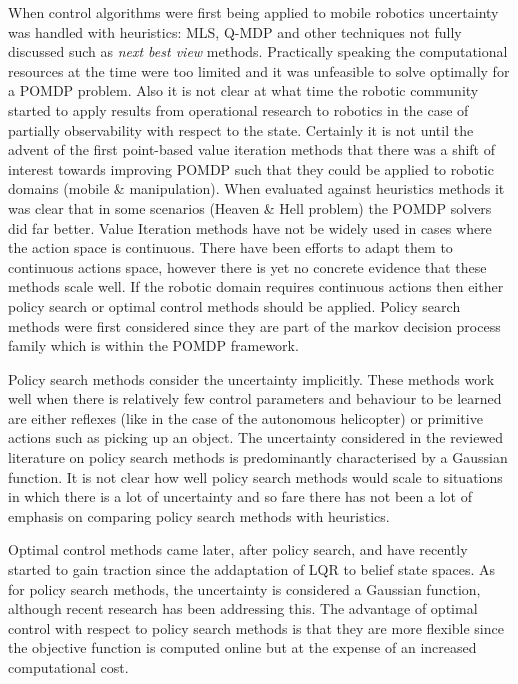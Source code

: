 When control algorithms were first being applied to mobile robotics uncertainty was handled with heuristics: 
MLS, Q-MDP and other techniques not fully discussed such as \textit{next best view} methods. Practically speaking 
the computational resources at the time were too limited and it was unfeasible to solve optimally for a POMDP problem. 
Also it is not clear at what time the robotic community started to apply results from operational research to robotics
in the case of partially observability with respect to the state.
Certainly it is not until the advent of the first point-based value iteration methods that there was a shift of interest 
towards improving POMDP such that they could be applied to robotic domains (mobile \& manipulation). 
When evaluated against heuristics methods it was clear that in some scenarios (Heaven \& Hell problem) 
the POMDP solvers did far better. Value Iteration methods have not be widely used in cases where the action space 
is continuous. There have been efforts to adapt them to continuous actions space, however there is yet no concrete evidence 
that these methods scale well. If the robotic domain requires continuous actions then either policy search or optimal control 
methods should be applied. Policy search methods were first considered since they are part of the markov decision process 
family which is within the POMDP framework.

Policy search methods consider the uncertainty implicitly. These methods work 
well when there is relatively few control parameters and behaviour to be learned are either reflexes (like in the case of 
the autonomous helicopter) or primitive actions such as picking up an object. The uncertainty considered 
in the reviewed literature on policy search methods is predominantly characterised by a Gaussian function. It is not clear 
how well policy search methods would scale to situations in which there is a lot of uncertainty and so fare there has not 
been a lot of emphasis on comparing policy search methods with heuristics. 

Optimal control methods came later, after policy search, and have recently started to gain traction since the addaptation 
of LQR to belief state spaces. As for policy search methods, the uncertainty is considered a Gaussian function, although recent research 
has been addressing this. The advantage of optimal control with respect to policy search methods is that they are more 
flexible since the objective function is computed online but at the expense of an increased computational cost.

